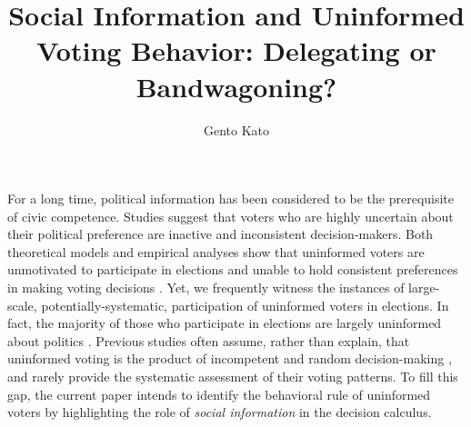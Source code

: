 \documentclass[doc,natbib,12pt]{apa6}\usepackage[]{graphicx}\usepackage[]{color}
\title{Social Information and Uninformed Voting Behavior: Delegating or Bandwagoning?} %
\author{Gento Kato}
\affiliation{Department of Political Science, University of California, Davis}
\begin{document}
    

    
    \maketitle
    
    
    \par For a long time, political information has been considered to be the prerequisite of civic competence. Studies suggest that voters who are highly uncertain about their political preference are inactive and inconsistent decision-makers. Both theoretical models and empirical analyses show that uninformed voters are unmotivated to participate in elections\citep{Matsusaka1995exvo, Dellicarpini1996wham} and unable to hold consistent preferences in making voting decisions \citep{Converse1964thna, Broockman2016apto}. Yet, we frequently witness the instances of large-scale, potentially-systematic, participation of uninformed voters in elections. In fact, the majority of those who participate in elections are largely uninformed about politics \citep{Dellicarpini1996wham}. Previous studies often assume, rather than explain, that uninformed voting is the product of incompetent and random decision-making \citep{Bartels1996unvo, Fowler2014thpo}, and rarely provide the systematic assessment of their voting patterns. To fill this gap, the current paper intends to identify the behavioral rule of uninformed voters by highlighting the role of \textit{social information} in the decision calculus.
    
    
\end{document}
